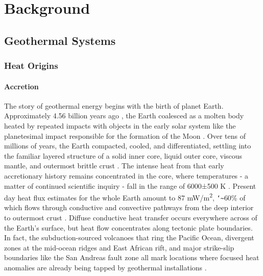 \chapter{Background}\label{ch2:background}

\section{Geothermal Systems}\label{ch2:geosys}
\subsection{Heat Origins}
\subsubsection{Accretion}
The story of geothermal energy begins with the birth of planet Earth. Approximately 4.56 billion years ago \citep{allegre_age_1995, patterson_age_1956}, the Earth coalesced as a molten body heated by repeated impacts with objects in the early solar system like the planetesimal impact responsible for the formation of the Moon \citep{stevenson_origin_2014}. Over tens of millions of years, the Earth compacted, cooled, and differentiated, settling into the familiar layered structure of a solid inner core, liquid outer core, viscous mantle, and outermost brittle crust \citep[~p. 7]{press_understanding_2004}. The intense heat from that early accretionary history remains concentrated in the core, where temperatures - a matter of continued scientific inquiry - fall in the range of 6000±500 K \citep[~p. 372]{fowler_solid_2005}. Present day heat flux estimates for the whole Earth amount to 87 mW/m\textsuperscript{2}, \texttt{\char`\~}60\% of which flows through conductive and convective pathways from the deep interior to outermost crust \citep{stein_heat_1995}. Diffuse conductive heat transfer occurs everywhere across of the Earth’s surface, but heat flow concentrates along tectonic plate boundaries. In fact, the subduction-sourced volcanoes that ring the Pacific Ocean, divergent zones at the mid-ocean ridges and East African rift, and major strike-slip boundaries like the San Andreas fault zone all mark locations where focused heat anomalies are already being tapped by geothermal installations \citep[~p. 16]{dipippo_geothermal_2012}.
